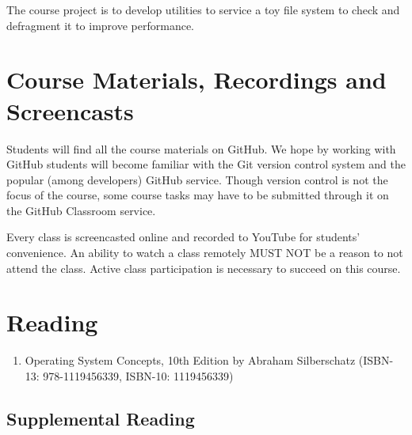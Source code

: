\documentclass[12pt,a4paper,oneside]{article}
\begin{document}
        The course project is to develop utilities to service a toy file system
        to check and defragment it to improve performance.

    \section{Course Materials, Recordings and Screencasts}

        Students will find all the course materials on GitHub. We hope by
        working with GitHub students will become familiar with the Git version
        control system and the popular (among developers) GitHub service. Though
        version control is not the focus of the course, some course tasks may
        have to be submitted through it on the GitHub Classroom service.

        Every class is screencasted online and recorded to YouTube for
        students’ convenience. An ability to watch a class remotely MUST NOT be
        a reason to not attend the class. Active class participation is
        necessary to succeed on this course.

    \section{Reading}

        \begin{enumerate}
            \item Operating System Concepts, 10th Edition by Abraham
            Silberschatz (ISBN-13: 978-1119456339, ISBN-10: 1119456339)
        \end{enumerate}

        \subsection{Supplemental Reading}
\end{document}
